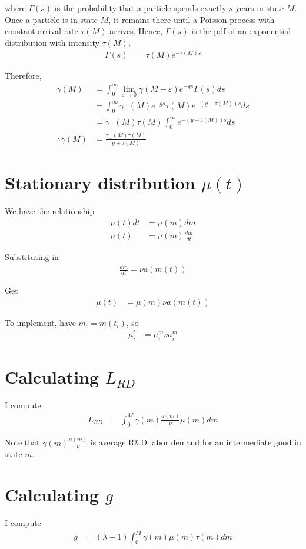 \documentclass[12pt,english]{article}
\theoremstyle{remark}
\begin{document}
where $\Gamma(s)$ is the probability that a particle spends exactly $s$ years in state $M$.  
Once a particle is in state $M$, it remains there until a Poisson process with constant arrival rate $\tau(M)$ arrives. Hence, $\Gamma(s)$ is the pdf of an exponential distribution with intensity $\tau(M)$, 
\begin{align*}
	\Gamma(s) &= \tau(M) e^{-\tau(M)s}
\end{align*}

Therefore, 
\begin{align}
	\gamma(M) &= \int_0^{\infty} \lim_{\varepsilon \to 0} \gamma(M-\varepsilon) e^{-gs} \Gamma(s) ds \nonumber \\
		      &= \int_0^{\infty} \gamma_{-}(M) e^{-gs} \tau(M) e^{-(g + \tau(M))s} ds \nonumber \\
	          &= \gamma_{-}(M) \tau(M) \int_0^{\infty} e^{-(g+ \tau(M))s} ds \nonumber \\
   \therefore \gamma(M)  &= \frac{\gamma_{-}(M) \tau(M)}{g+\tau(M)}
\end{align}


\section{Stationary distribution $\mu(t)$}

We have the relationship
\begin{align*}
\mu(t)dt &= \mu(m)dm \\
\mu(t) &= \mu(m) \frac{dm}{dt}
\end{align*}

Substituting in
\begin{align*}
\frac{dm}{dt} = \nu a(m(t))
\end{align*}

Get 
\begin{align*}
\mu(t) &= \mu(m) \nu a(m(t))
\end{align*}

To implement, have $m_i = m(t_i)$, so
\begin{align*}
\mu^t_i &= \mu^m_i \nu a^m_i 
\end{align*}



\section{Calculating $L_{RD}$}

I compute
\begin{align*}
	L_{RD} &= \int_0^M \gamma(m) \frac{a(m)}{\nu} \mu(m)  dm
\end{align*}

Note that $\gamma(m) \frac{a(m)}{\nu}$ is average R\&D labor demand for an intermediate good in state $m$.

\section{Calculating $g$}

I compute
\begin{align*}
	g &= (\lambda - 1)\int_0^M \gamma(m) \mu(m) \tau(m) dm
\end{align*}
\end{document}
